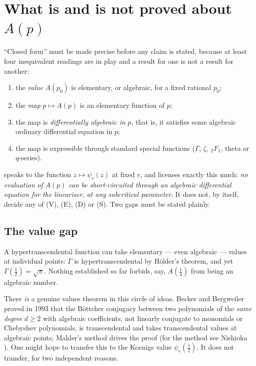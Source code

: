 \section{What is and is not proved about \texorpdfstring{$A(p)$}{A(p)}}
\label{a:sec:scope}

``Closed form'' must be made precise before any claim is stated, because at least
four inequivalent readings are in play and a result for one is not a result for
another:
\begin{enumerate}[leftmargin=*]
\item[\textbf{(V)}] the \emph{value} $A(p_0)$ is elementary, or algebraic, for a
      fixed rational $p_0$;
\item[\textbf{(E)}] the \emph{map} $p\mapsto A(p)$ is an elementary function of
      $p$;
\item[\textbf{(D)}] the map is \emph{differentially algebraic in $p$}, that is, it
      satisfies some algebraic ordinary differential equation in $p$;
\item[\textbf{(S)}] the map is expressible through standard special functions
      ($\Gamma$, $\zeta$, ${}_2F_1$, theta or $q$-series).
\end{enumerate}
 speaks to the function $z\mapsto\psi_r(z)$ at fixed $r$, and
licenses exactly this much: \emph{no evaluation of $A(p)$ can be short-circuited
through an algebraic differential equation for the lineariser, at any subcritical
parameter}. It does not, by itself, decide any of (V), (E), (D) or (S). Two gaps
must be stated plainly.

\subsection*{The value gap}

A hypertranscendental function can take elementary --- even algebraic --- values at
individual points: $\Gamma$ is hypertranscendental by Hölder's theorem, and yet
$\Gamma(\tfrac12)=\sqrt\pi$. Nothing established so far forbids, say, $A(\tfrac14)$
from being an algebraic number.

There \emph{is} a genuine values theorem in this circle of ideas. Becker and
Bergweiler proved in 1993 \cite{Becker1993} that the Böttcher conjugacy between two
polynomials of the \emph{same degree} $d\ge2$ with algebraic coefficients, not
linearly conjugate to monomials or Chebyshev polynomials, is transcendental and
takes transcendental values at algebraic points; Mahler's method drives the proof
(for the method see Nishioka \cite{Nishioka1996}). One might hope to transfer this
to the Koenigs value $\psi_r(\tfrac12)$. It does not transfer, for two independent
reasons.

